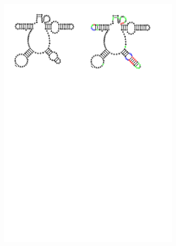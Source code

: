 \begin{figure}[t!]
\begin{subfigure}[t]{\wi}
    \includegraphics[clip, trim=10.5cm 21cm 2.5cm 1cm, width=1\textwidth]{../img/alg/insert/multibranch}
  \end{subfigure}


\end{figure}
